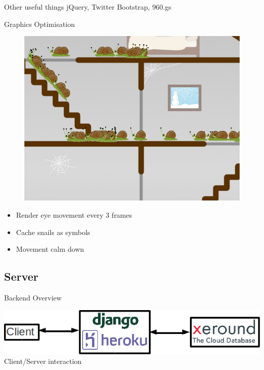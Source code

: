 \documentclass{beamer}
\begin{document}
\begin{frame}{Other useful things}
  jQuery, Twitter Bootstrap, 960.gs
\end{frame}

\begin{frame}{Graphics Optimisation}
  \begin{figure}[Snails]
    \centering
    \includegraphics[scale=0.25]{SnailsScreenshot.png}
  \end{figure}
  \begin{itemize}
    \item Render eye movement every 3 frames
    \item Cache snails as symbols
    \item Movement calm down
  \end{itemize}
\end{frame}

\subsection{Server}

\begin{frame}{Backend Overview}
  \begin{center}
    \includegraphics[scale=0.4]{client_server_structure.png} \\
    Client/Server interaction
  \end{center}
\end{frame}
\end{document}
